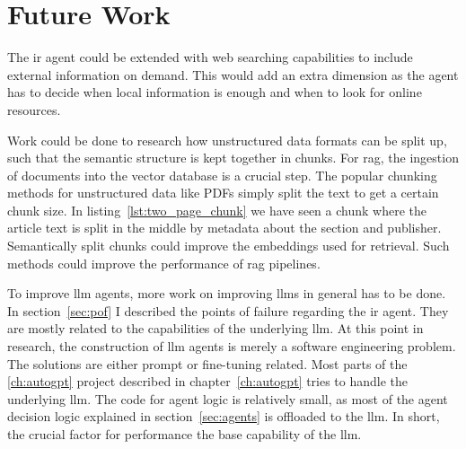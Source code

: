 \documentclass[../main.tex]{subfiles}
\begin{document}
\section{Future Work}

The \gls{ir} agent could be extended with web searching capabilities
to include external information on demand.
This would add an extra dimension as the agent has to decide when local information
is enough and when to look for online resources.

Work could be done to research how unstructured data formats can be split up,
such that the semantic structure is kept together in chunks.
For \gls{rag}, the ingestion of documents into the vector database is a crucial step.
The popular chunking methods for unstructured data like PDFs simply split the text to get a certain chunk size.
In listing~\ref{lst:two_page_chunk} we have seen a chunk where the article text is split in the middle
by metadata about the section and publisher.
Semantically split chunks could improve the embeddings used for retrieval.
Such methods could improve the performance of \gls{rag} pipelines.

To improve \gls{llm} agents, more work on improving \glspl{llm} in
general has to be done.
In section~\ref{sec:pof} I described the points of failure regarding the \gls{ir} agent.
They are mostly related to the capabilities of the underlying \gls{llm}.
At this point in research,
the construction of \gls{llm} agents is merely a software engineering problem.
The solutions are either prompt or fine-tuning related.
Most parts of the \ref{ch:autogpt} project described in chapter~\ref{ch:autogpt} tries
to handle the underlying \gls{llm}.
The code for agent logic is relatively small, as most of the agent decision logic
explained in section~\ref{sec:agents} is offloaded to the \gls{llm}.
In short, the crucial factor for performance the base capability of the \gls{llm}.
\end{document}
